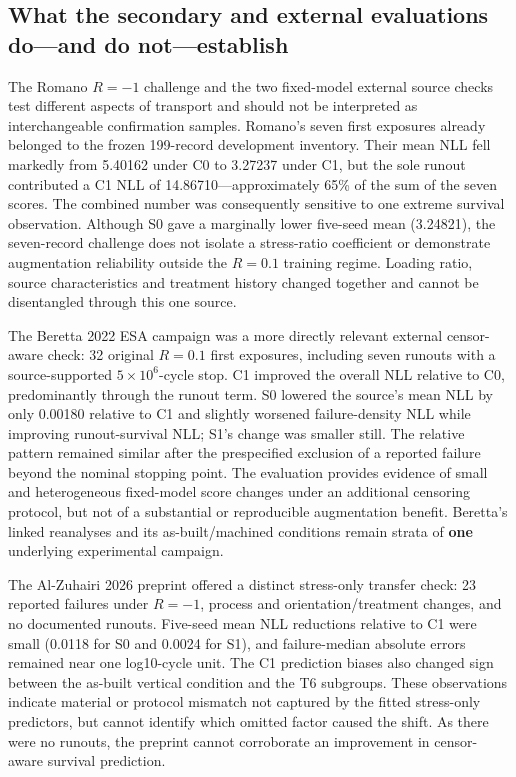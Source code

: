\documentclass[12pt,a4paper]{article}
\begin{document}
\subsection{What the secondary and external evaluations do—and do not—establish}

The Romano \(R=-1\) challenge and the two fixed-model external source checks test different aspects of transport and should not be interpreted as interchangeable confirmation samples. Romano's seven first exposures already belonged to the frozen 199-record development inventory. Their mean NLL fell markedly from 5.40162 under C0 to 3.27237 under C1, but the sole runout contributed a C1 NLL of 14.86710—approximately 65\% of the sum of the seven scores. The combined number was consequently sensitive to one extreme survival observation. Although S0 gave a marginally lower five-seed mean (3.24821), the seven-record challenge does not isolate a stress-ratio coefficient or demonstrate augmentation reliability outside the \(R=0.1\) training regime. Loading ratio, source characteristics and treatment history changed together and cannot be disentangled through this one source.

The Beretta 2022 ESA campaign was a more directly relevant external censor-aware check: 32 original \(R=0.1\) first exposures, including seven runouts with a source-supported \(5\times10^6\)-cycle stop. C1 improved the overall NLL relative to C0, predominantly through the runout term. S0 lowered the source's mean NLL by only 0.00180 relative to C1 and slightly worsened failure-density NLL while improving runout-survival NLL; S1's change was smaller still. The relative pattern remained similar after the prespecified exclusion of a reported failure beyond the nominal stopping point. The evaluation provides evidence of small and heterogeneous fixed-model score changes under an additional censoring protocol, but not of a substantial or reproducible augmentation benefit. Beretta's linked reanalyses and its as-built/machined conditions remain strata of \textbf{one} underlying experimental campaign.

The Al-Zuhairi 2026 preprint offered a distinct stress-only transfer check: 23 reported failures under \(R=-1\), process and orientation/treatment changes, and no documented runouts. Five-seed mean NLL reductions relative to C1 were small (0.0118 for S0 and 0.0024 for S1), and failure-median absolute errors remained near one log10-cycle unit. The C1 prediction biases also changed sign between the as-built vertical condition and the T6 subgroups. These observations indicate material or protocol mismatch not captured by the fitted stress-only predictors, but cannot identify which omitted factor caused the shift. As there were no runouts, the preprint cannot corroborate an improvement in censor-aware survival prediction.
\end{document}
